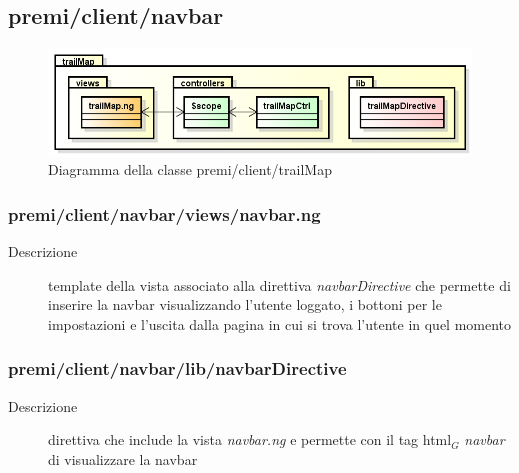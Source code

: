 \clearpage
\subsection{premi/client/navbar}
\begin{figure}[H]
\begin{center}
\includegraphics[scale=0.70]{img/diapkg/trailMap.png}
\caption{Diagramma della classe premi/client/trailMap}
\end{center}
\end{figure}

\subsubsection{premi/client/navbar/views/navbar.ng}

\begin{description}
\item[Descrizione] \hfill
	template della vista associato alla direttiva \textit{navbarDirective} che permette di inserire la navbar visualizzando l'utente loggato, i bottoni per le impostazioni e l'uscita dalla pagina in cui si trova l'utente in quel momento 
\end{description}

\subsubsection{premi/client/navbar/lib/navbarDirective}

\begin{description}
\item[Descrizione] \hfill
	direttiva che include la vista \textit{navbar.ng} e permette con il tag html$_G$ \textit{navbar} di visualizzare la navbar
\end{description}